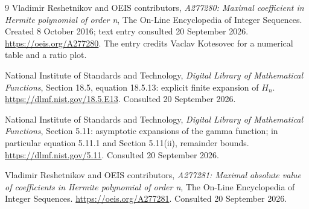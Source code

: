 \documentclass[11pt,letterpaper]{article}
\theoremstyle{remark}
\begin{document}
\begin{thebibliography}{9}
Vladimir Reshetnikov and OEIS contributors,
\emph{A277280: Maximal coefficient in Hermite polynomial of order n},
The On-Line Encyclopedia of Integer Sequences.
Created 8 October 2016; text entry consulted 20 September 2026.
\url{https://oeis.org/A277280}.
The entry credits Vaclav Kotesovec for a numerical table and a ratio plot.

National Institute of Standards and Technology,
\emph{Digital Library of Mathematical Functions},
Section 18.5, equation 18.5.13: explicit finite expansion of $H_n$.
\url{https://dlmf.nist.gov/18.5.E13}.
Consulted 20 September 2026.

National Institute of Standards and Technology,
\emph{Digital Library of Mathematical Functions},
Section 5.11: asymptotic expansions of the gamma function;
in particular equation 5.11.1 and Section 5.11(ii), remainder bounds.
\url{https://dlmf.nist.gov/5.11}.
Consulted 20 September 2026.

Vladimir Reshetnikov and OEIS contributors,
\emph{A277281: Maximal absolute value of coefficients in Hermite polynomial
of order n}, The On-Line Encyclopedia of Integer Sequences.
\url{https://oeis.org/A277281}.
Consulted 20 September 2026.
\end{thebibliography}
\end{document}
